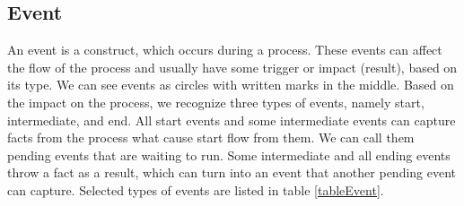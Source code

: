 \documentclass[thesis=M,english]{FITthesis}[2019/12/23]
\begin{document}
\subsection{Event}

An event is a construct, which occurs during a process. These events can affect the flow of the process and usually have some trigger or impact (result), based on its type. We can see events as circles with written marks in the middle. Based on the impact on the process, we recognize three types of events, namely start, intermediate, and end. All start events and some intermediate events can capture facts from the process what cause start flow from them. We can call them pending events that are waiting to run. Some intermediate and all ending events throw a fact as a result, which can turn into an event that another pending event can capture. Selected types of events are listed in table \ref{tableEvent}.
\end{document}
